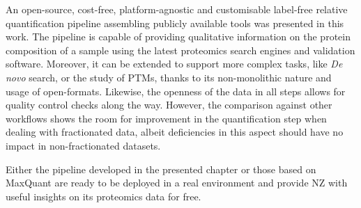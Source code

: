An open-source, cost-free, platform-agnostic and customisable label-free relative quantification pipeline assembling publicly available tools was presented in this work. The pipeline is capable of providing qualitative information on the protein composition of a sample using the latest proteomics search engines and validation software. Moreover, it can be extended to support more complex tasks, like \textit{De novo} search, or the study of \ac{PTM}s, thanks to its non-monolithic nature and usage of open-formats. Likewise, the openness of the data in all steps allows for quality control checks along the way. However, the comparison against other workflows shows the room for improvement in the quantification step when dealing with fractionated data, albeit deficiencies in this aspect should have no impact in non-fractionated datasets.

Either the pipeline developed in the presented chapter or those based on MaxQuant are ready to be deployed in a real environment and provide \ac{NZ} with useful insights on its proteomics data for free.